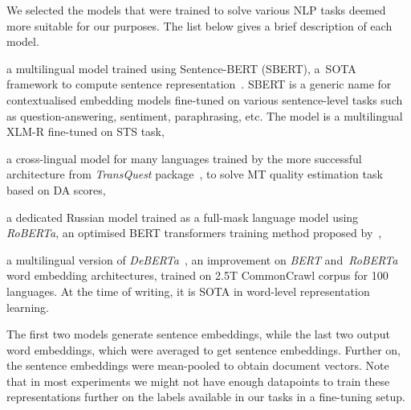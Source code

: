 We selected the models that were trained to solve various NLP tasks deemed more suitable for our purposes. The list below gives a brief description of each model. 
\label{pg:embeddings}
\begin{description}\compresslist{}
	\item[stsb-xlm-r-m:] a multilingual model trained using Sentence-BERT (SBERT), a~\gls{SOTA} framework to compute sentence representation~\cite{Reimers2019}. SBERT is a generic name for contextualised embedding models fine-tuned on various sentence-level tasks such as question-answering, sentiment, paraphrasing, etc. The model is a multilingual XLM-R fine-tuned on \gls{STS} task,
	
	\item[TQmono-m:] a cross-lingual model for many languages trained by the more successful architecture from \textit{TransQuest} package~\cite{Ranasinghe2020}, to solve MT quality estimation task based on DA scores,
	
	\item[ruRoberta:] a dedicated Russian model trained as a full-mask language model using \textit{RoBERTa}, an optimised BERT transformers training method proposed by~\citet{Liu2019},
	
	\item[mdeberta3:] a multilingual version of \textit{DeBERTa}~\cite{He2021}, an improvement on \textit{BERT} and~\textit{RoBERTa} word embedding architectures, trained on 2.5T CommonCrawl corpus for 100 languages. At the time of writing, it is \gls{SOTA} in word-level representation learning. 
\end{description}

The first two models generate sentence embeddings, while the last two output word embeddings, which were averaged to get sentence embeddings. Further on, the sentence embeddings were mean-pooled to obtain document vectors. 
Note that in most experiments we might not have enough datapoints to train these representations further on the labels available in our tasks in a fine-tuning setup. %

